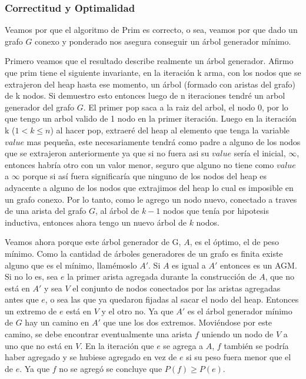 \subsubsection{Correctitud y Optimalidad}

Veamos por que el algoritmo de Prim es correcto, o sea, veamos por que dado un grafo $G$ conexo y ponderado nos asegura conseguir un árbol generador mínimo.

Primero veamos que el resultado describe realmente un árbol generador. Afirmo que prim tiene el siguiente invariante, en la iteración k arma, con los nodos que se extrajeron del heap hasta ese momento, un árbol (formado con aristas del grafo) de k nodos. Si demuestro esto entonces luego de n iteraciones tendré un arbol generador del grafo $G$. El primer pop saca a la raiz del arbol, el nodo 0, por lo que tengo un arbol valido de 1 nodo en la primer iteración. Luego en la iteración k ($ 1 < k \leq n $) al hacer pop, extraeré del heap al elemento que tenga la variable $value$ mas pequeña, este necesariamente tendrá como padre a alguno de los nodos que se extrajeron anteriormente ya que si no fuera asi su $value$ sería el inicial, $\infty$, entonces habría otro con un valor menor, seguro que alguno no tiene como $value$ a $\infty$ porque si así fuera significaría que ninguno de los nodos del heap es adyacente a alguno de los nodos que extrajimos del heap lo cual es imposible en un grafo conexo. Por lo tanto, como le agrego un nodo nuevo, conectado a traves de una arista del grafo $G$, al árbol de $k-1$ nodos que tenía por hipotesis inductiva, entonces ahora tengo un nuevo árbol de $k$ nodos.

Veamos ahora porque este árbol generador de G, $A$, es el óptimo, el de peso mínimo.
Como la cantidad de árboles generadores de un grafo es finita existe alguno que es el mínimo, llam\'emoslo $A'$.
Si $A$ es igual a $A'$ entonces es un AGM.
Si no lo es, sea $e$ la primer arista agregada durante la construcción de $A$, que no está en $A'$ y sea $V$ el conjunto de nodos conectados por las aristas agregadas antes que $e$, o sea las que ya quedaron fijadas al sacar el nodo del heap.
Entonces un extremo de $e$ está en $V$ y el otro no. Ya que $A'$ es el árbol generador mínimo de $G$ hay un camino en $A'$ que une los dos extremos. Moviéndose por este camino, se debe encontrar eventualmente una arista $f$ uniendo un nodo de $V$ a uno que no está en $V$. En la iteración que $e$ se agrega a $A$, $f$ también se podría haber agregado y se hubiese agregado en vez de $e$ si su peso fuera menor que el de $e$. Ya que $f$ no se agregó se concluye que $P(f) \geq P(e)$.


